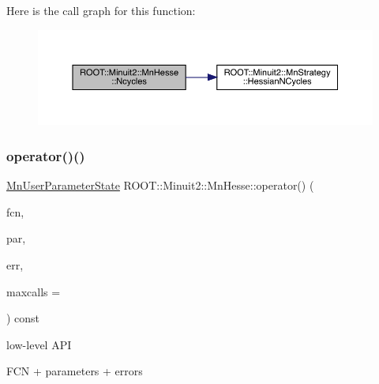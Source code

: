 Here is the call graph for this function\+:
\nopagebreak
\begin{figure}[H]
\begin{center}
\leavevmode
\includegraphics[width=350pt]{d1/d02/classROOT_1_1Minuit2_1_1MnHesse_a5a84b9459469f2edf55f28d8d579a00d_cgraph}
\end{center}
\end{figure}
\mbox{\label{classROOT_1_1Minuit2_1_1MnHesse_aa0af93c1c82038bab7ffe84c198fa176}} 
\subsubsection{\texorpdfstring{operator()()}{operator()()}\hspace{0.1cm}{\footnotesize\ttfamily [1/16]}}
{\footnotesize\ttfamily \mbox{\hyperlink{classROOT_1_1Minuit2_1_1MnUserParameterState}{Mn\+User\+Parameter\+State}} R\+O\+O\+T\+::\+Minuit2\+::\+Mn\+Hesse\+::operator() (\begin{DoxyParamCaption}\item[{const \mbox{\hyperlink{classROOT_1_1Minuit2_1_1FCNBase}{F\+C\+N\+Base}} \&}]{fcn,  }\item[{const std\+::vector$<$ double $>$ \&}]{par,  }\item[{const std\+::vector$<$ double $>$ \&}]{err,  }\item[{unsigned int}]{maxcalls = {} }\end{DoxyParamCaption}) const}

low-\/level A\+PI

F\+CN + parameters + errors \mbox{\label{classROOT_1_1Minuit2_1_1MnHesse_aa0af93c1c82038bab7ffe84c198fa176}} 
